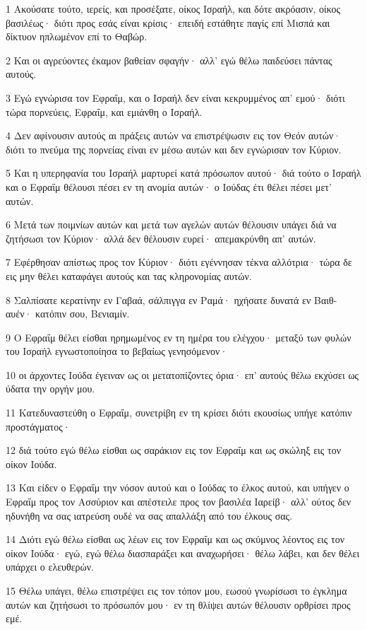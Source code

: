 \par 1 Ακούσατε τούτο, ιερείς, και προσέξατε, οίκος Ισραήλ, και δότε ακρόασιν, οίκος βασιλέως· διότι προς εσάς είναι κρίσις· επειδή εστάθητε παγίς επί Μισπά και δίκτυον ηπλωμένον επί το Θαβώρ.
\par 2 Και οι αγρεύοντες έκαμον βαθείαν σφαγήν· αλλ' εγώ θέλω παιδεύσει πάντας αυτούς.
\par 3 Εγώ εγνώρισα τον Εφραΐμ, και ο Ισραήλ δεν είναι κεκρυμμένος απ' εμού· διότι τώρα πορνεύεις, Εφραΐμ, και εμιάνθη ο Ισραήλ.
\par 4 Δεν αφίνουσιν αυτούς αι πράξεις αυτών να επιστρέψωσιν εις τον Θεόν αυτών· διότι το πνεύμα της πορνείας είναι εν μέσω αυτών και δεν εγνώρισαν τον Κύριον.
\par 5 Και η υπερηφανία του Ισραήλ μαρτυρεί κατά πρόσωπον αυτού· διά τούτο ο Ισραήλ και ο Εφραΐμ θέλουσι πέσει εν τη ανομία αυτών· ο Ιούδας έτι θέλει πέσει μετ' αυτών.
\par 6 Μετά των ποιμνίων αυτών και μετά των αγελών αυτών θέλουσιν υπάγει διά να ζητήσωσι τον Κύριον· αλλά δεν θέλουσιν ευρεί· απεμακρύνθη απ' αυτών.
\par 7 Εφέρθησαν απίστως προς τον Κύριον· διότι εγέννησαν τέκνα αλλότρια· τώρα δε εις μην θέλει καταφάγει αυτούς και τας κληρονομίας αυτών.
\par 8 Σαλπίσατε κερατίνην εν Γαβαά, σάλπιγγα εν Ραμά· ηχήσατε δυνατά εν Βαιθ-αυέν· κατόπιν σου, Βενιαμίν.
\par 9 Ο Εφραΐμ θέλει είσθαι ηρημωμένος εν τη ημέρα του ελέγχου· μεταξύ των φυλών του Ισραήλ εγνωστοποίησα το βεβαίως γενησόμενον·
\par 10 οι άρχοντες Ιούδα έγειναν ως οι μετατοπίζοντες όρια· επ' αυτούς θέλω εκχύσει ως ύδατα την οργήν μου.
\par 11 Κατεδυναστεύθη ο Εφραΐμ, συνετρίβη εν τη κρίσει διότι εκουσίως υπήγε κατόπιν προστάγματος·
\par 12 διά τούτο εγώ θέλω είσθαι ως σαράκιον εις τον Εφραΐμ και ως σκώληξ εις τον οίκον Ιούδα.
\par 13 Και είδεν ο Εφραΐμ την νόσον αυτού και ο Ιούδας το έλκος αυτού, και υπήγεν ο Εφραΐμ προς τον Ασσύριον και απέστειλε προς τον βασιλέα Ιαρείβ· αλλ' ούτος δεν ηδυνήθη να σας ιατρεύση ουδέ να σας απαλλάξη από του έλκους σας.
\par 14 Διότι εγώ θέλω είσθαι ως λέων εις τον Εφραΐμ και ως σκύμνος λέοντος εις τον οίκον Ιούδα· εγώ, εγώ θέλω διασπαράξει και αναχωρήσει· θέλω λάβει, και δεν θέλει υπάρχει ο ελευθερών.
\par 15 Θέλω υπάγει, θέλω επιστρέψει εις τον τόπον μου, εωσού γνωρίσωσι το έγκλημα αυτών και ζητήσωσι το πρόσωπόν μου· εν τη θλίψει αυτών θέλουσιν ορθρίσει προς εμέ.


